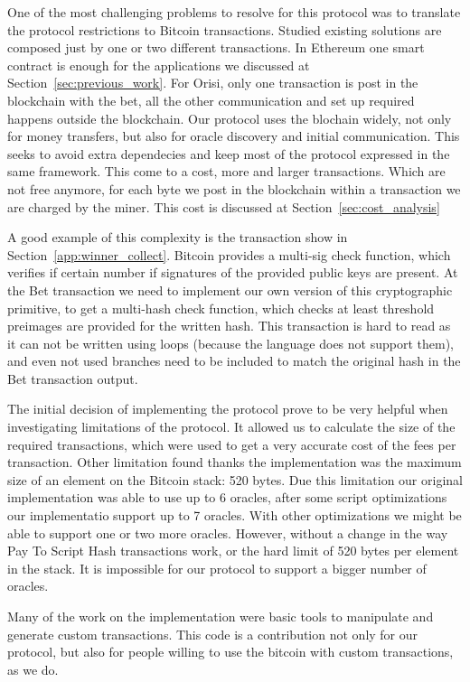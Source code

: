 One of the most challenging problems to resolve for this protocol was to
  translate the protocol restrictions to Bitcoin transactions.
Studied existing solutions are composed just by one or two different
  transactions.
In Ethereum one smart contract is enough for the applications we discussed at
  Section~\ref{sec:previous_work}.
For Orisi, only one transaction is post in the blockchain with the bet, all
  the other communication and set up required happens outside the blockchain.
Our protocol uses the blochain widely, not only for money transfers, but also
  for oracle discovery and initial communication.
This seeks to avoid extra dependecies and keep most of the protocol expressed
  in the same framework.
This come to a cost, more and larger transactions.
Which are not free anymore, for each byte we post in the blockchain within
  a transaction we are charged by the miner.
This cost is discussed at Section~\ref{sec:cost_analysis}

A good example of this complexity is the transaction show in
  Section~\ref{app:winner_collect}.
Bitcoin provides a multi-sig check function, which verifies if certain number
  if signatures of the provided public keys are present.
At the Bet transaction we need to implement our own version of this
  cryptographic primitive, to get a multi-hash check function, which checks
  at least threshold preimages are provided for the written hash.
This transaction is hard to read as it can not be written using loops (because
  the language does not support them), and even not used branches need to be
  included to match the original hash in the Bet transaction output.

The initial decision of implementing the protocol prove to be very helpful when
  investi\-ga\-ting limitations of the protocol.
It allowed us to calculate the size of the required transactions, which were
  used to get a very accurate cost of the fees per transaction.
Other limitation found thanks the implementation was the maximum size of an
  element on the Bitcoin stack: 520 bytes.
Due this limitation our original implementation was able to use up to 6 oracles,
  after some script optimizations our implementatio support up to 7 oracles.
With other optimizations we might be able to support one or two more oracles.
However, without a change in the way Pay To Script Hash transactions work, or
  the hard limit of 520 bytes per element in the stack.
It is impossible for our protocol to support a bigger number of oracles.

Many of the work on the implementation were basic tools to manipulate and
  generate custom transactions.
This code is a contribution not only for our protocol, but also for people
  willing to use the bitcoin with custom transactions, as we do.

